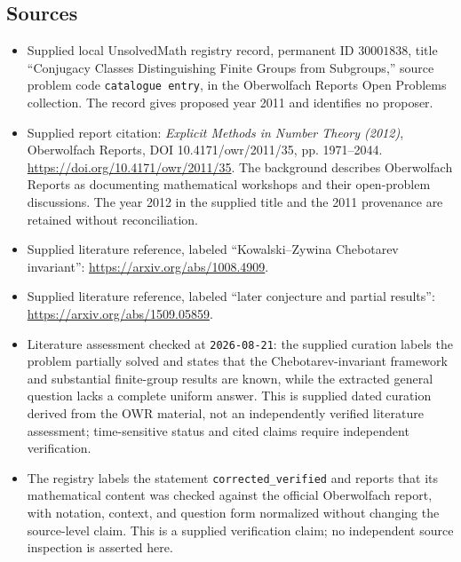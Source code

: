 \documentclass[11pt]{article}
\begin{document}
\subsection{Sources}
\begin{itemize}
\item Supplied local UnsolvedMath registry record, permanent ID \(30001838\), title ``Conjugacy Classes Distinguishing Finite Groups from Subgroups,'' source problem code \texttt{catalogue entry}, in the Oberwolfach Reports Open Problems collection. The record gives proposed year 2011 and identifies no proposer.
\item Supplied report citation: \emph{Explicit Methods in Number Theory (2012)}, Oberwolfach Reports, DOI 10.4171/owr/2011/35, pp. 1971--2044. \url{https://doi.org/10.4171/owr/2011/35}. The background describes Oberwolfach Reports as documenting mathematical workshops and their open-problem discussions. The year 2012 in the supplied title and the 2011 provenance are retained without reconciliation.
\item Supplied literature reference, labeled ``Kowalski--Zywina Chebotarev invariant'': \url{https://arxiv.org/abs/1008.4909}.
\item Supplied literature reference, labeled ``later conjecture and partial results'': \url{https://arxiv.org/abs/1509.05859}.
\item Literature assessment checked at \texttt{2026-08-21}: the supplied curation labels the problem partially solved and states that the Chebotarev-invariant framework and substantial finite-group results are known, while the extracted general question lacks a complete uniform answer. This is supplied dated curation derived from the OWR material, not an independently verified literature assessment; time-sensitive status and cited claims require independent verification.
\item The registry labels the statement \texttt{corrected\_verified} and reports that its mathematical content was checked against the official Oberwolfach report, with notation, context, and question form normalized without changing the source-level claim. This is a supplied verification claim; no independent source inspection is asserted here.
\end{itemize}
\end{document}
